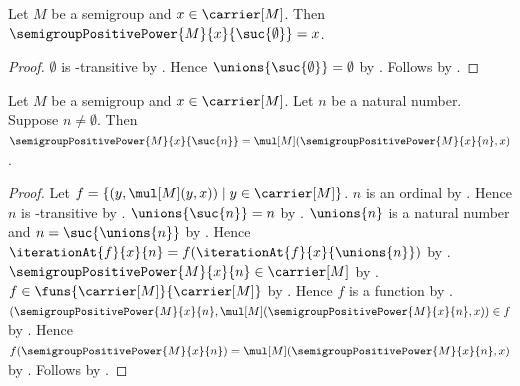 \begin{proposition}\label{semigroup_positive_power_one}
    Let $M$ be a semigroup and $x\in\carrier[M]$.
    Then $\semigroupPositivePower{M}{x}{\suc{\emptyset}}=x$.
\end{proposition}
\begin{proof}
    $\emptyset$ is \in-transitive by .
    Hence $\unions{\suc{\emptyset}}=\emptyset$ by
        .
    Follows by
        .
\end{proof}

\begin{proposition}\label{semigroup_positive_power_successor}
    Let $M$ be a semigroup and $x\in\carrier[M]$.
    Let $n$ be a natural number.
    Suppose $n\neq\emptyset$.
    Then $\semigroupPositivePower{M}{x}{\suc{n}}
        =\mul[M](\semigroupPositivePower{M}{x}{n},x)$.
\end{proposition}
\begin{proof}
    Let $f=\{(y,\mul[M](y,x))\mid y\in\carrier[M]\}$.
    $n$ is an ordinal by .
    Hence $n$ is \in-transitive by .
    $\unions{\suc{n}}=n$ by
        .
    $\unions{n}$ is a natural number and
        $n=\suc{\unions{n}}$ by
        .
    Hence $\iterationAt{f}{x}{n}
        =f(\iterationAt{f}{x}{\unions{n}})$ by
        .
    $\semigroupPositivePower{M}{x}{n}\in\carrier[M]$ by
        .
    $f\in\funs{\carrier[M]}{\carrier[M]}$ by
        .
    Hence $f$ is a function by .
    $(\semigroupPositivePower{M}{x}{n},
        \mul[M](\semigroupPositivePower{M}{x}{n},x))\in f$ by
        .
    Hence $f(\semigroupPositivePower{M}{x}{n})
        =\mul[M](\semigroupPositivePower{M}{x}{n},x)$ by
        .
    Follows by .
\end{proof}

